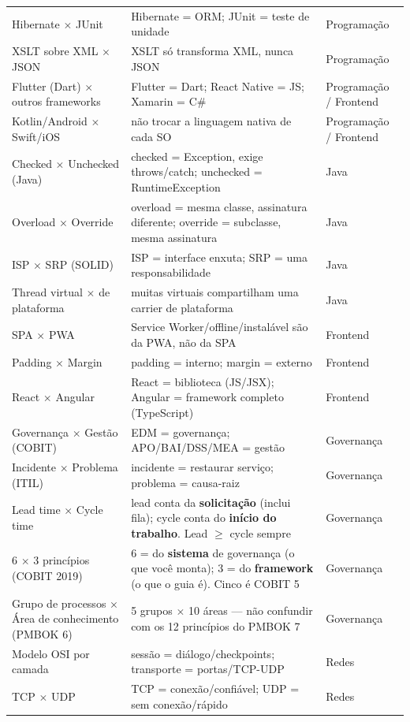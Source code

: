 \begin{longtable}{@{}p{3.3cm}p{6.1cm}p{2.6cm}@{}}
Hibernate $\times$ JUnit & Hibernate = ORM; JUnit = teste de unidade & Programação \\
XSLT sobre XML $\times$ JSON & XSLT só transforma XML, nunca JSON & Programação \\
Flutter (Dart) $\times$ outros frameworks & Flutter = Dart; React Native = JS; Xamarin = C\# & Programação / Frontend \\
Kotlin/Android $\times$ Swift/iOS & não trocar a linguagem nativa de cada SO & Programação / Frontend \\
Checked $\times$ Unchecked (Java) & checked = Exception, exige throws/catch; unchecked = RuntimeException & Java \\
Overload $\times$ Override & overload = mesma classe, assinatura diferente; override = subclasse, mesma assinatura & Java \\
ISP $\times$ SRP (SOLID) & ISP = interface enxuta; SRP = uma responsabilidade & Java \\
Thread virtual $\times$ de plataforma & muitas virtuais compartilham uma carrier de plataforma & Java \\
SPA $\times$ PWA & Service Worker/offline/instalável são da PWA, não da SPA & Frontend \\
Padding $\times$ Margin & padding = interno; margin = externo & Frontend \\
React $\times$ Angular & React = biblioteca (JS/JSX); Angular = framework completo (TypeScript) & Frontend \\
Governança $\times$ Gestão (COBIT) & EDM = governança; APO/BAI/DSS/MEA = gestão & Governança \\
Incidente $\times$ Problema (ITIL) & incidente = restaurar serviço; problema = causa-raiz & Governança \\
Lead time $\times$ Cycle time & lead conta da \textbf{solicitação} (inclui fila); cycle conta do \textbf{início do trabalho}. Lead $\geq$ cycle sempre & Governança \\
6 $\times$ 3 princípios (COBIT 2019) & 6 = do \textbf{sistema} de governança (o que você monta); 3 = do \textbf{framework} (o que o guia é). Cinco é COBIT 5 & Governança \\
Grupo de processos $\times$ Área de conhecimento (PMBOK 6) & 5 grupos $\times$ 10 áreas --- não confundir com os 12 princípios do PMBOK 7 & Governança \\
Modelo OSI por camada & sessão = diálogo/checkpoints; transporte = portas/TCP-UDP & Redes \\
TCP $\times$ UDP & TCP = conexão/confiável; UDP = sem conexão/rápido & Redes \\

\end{longtable}
